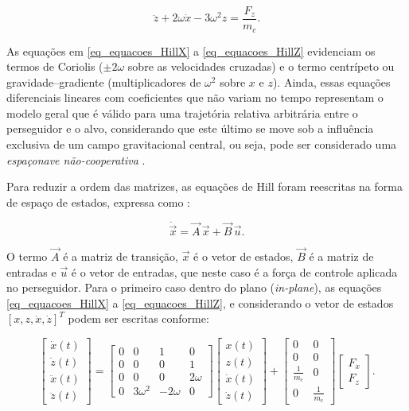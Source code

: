 \begin{equation}
    \label{eq_equacoes_HillZ}
\ddot{z} + 2\omega \dot{x} - 3 \omega^2 z = \frac{F_z}{m_c}.
\end{equation}

As equações em \eqref{eq_equacoes_HillX} a \eqref{eq_equacoes_HillZ} evidenciam os termos de Coriolis ($\pm2\omega$ sobre as velocidades cruzadas) e o termo centrípeto ou gravidade--gradiente (multiplicadores de $\omega^2$ sobre $x$ e $z$).
Ainda, essas equações diferenciais lineares com coeficientes que não variam no tempo representam o modelo geral que é válido para uma trajetória relativa arbitrária \cite{debruijn2011,ortolano2017} entre o perseguidor e o alvo, considerando que este último se move sob a influência exclusiva de um campo gravitacional central, ou seja, pode ser considerado uma \emph{espaçonave não-cooperativa} \cite{mahendrakar2023}.

Para reduzir a ordem das matrizes, as equações de Hill foram reescritas na forma de espaço de estados, expressa como \cite{fehse2003,starek2016,sherrill2014}:

\begin{equation}
    \dot{\vec{x}} = \vec{A}\,\vec{x} + \vec{B}\,\vec{u}
    \label{eq_state_space_general}.
\end{equation}

O termo $\vec{A}$ é a matriz de transição, $\vec{x}$ é o vetor de estados, $\vec{B}$ é a matriz de entradas e $\vec{u}$ é o vetor de entradas, que neste caso é a força de controle aplicada no perseguidor.
Para o primeiro caso dentro do plano (\textit{in-plane}), as equações \eqref{eq_equacoes_HillX} a \eqref{eq_equacoes_HillZ}, e considerando o vetor de estados
$[x, z, \dot{x}, \dot{z}]^T$ podem ser escritas conforme:

\begin{equation}
\begin{bmatrix}
\dot{x}(t) \\[0.3em]
\dot{z}(t) \\[0.3em]
\ddot{x}(t) \\[0.3em]
\ddot{z}(t)
\end{bmatrix}
=
\begin{bmatrix}
0 & 0 & 1 & 0 \\
0 & 0 & 0 & 1 \\
0 & 0 & 0 & 2\omega \\
0 & 3\omega^2 & -2\omega & 0
\end{bmatrix}
\begin{bmatrix}
x(t) \\[0.3em]
z(t) \\[0.3em]
\dot{x}(t) \\[0.3em]
\dot{z}(t)
\end{bmatrix}
+
\begin{bmatrix}
0 & 0 \\
0 & 0 \\
\frac{1}{m_c} & 0 \\
0 & \frac{1}{m_c}
\end{bmatrix}
\begin{bmatrix}
F_x \\[0.3em]
F_z
\end{bmatrix}.
\label{eq_inplane}
\end{equation}

